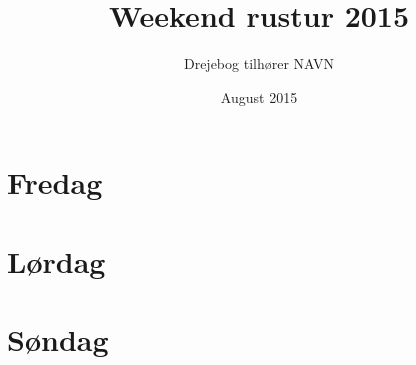\documentclass[11pt,a4paper,oneside,hidelinks]{article}
\title{Weekend rustur 2015}
\author{Drejebog tilhører NAVN}
\date{August 2015}
\newcommand{\lheadmsg}{Weekend 2015}
\begin{document}

\begin{titlepage}

\thispagestyle{empty} %
\end{titlepage}
\tableofcontents






\clearpage



\section*{Fredag}
\renewcommand{\lheadmsg}{Fredag}

\newpage




\clearpage

\section*{Lørdag}
\renewcommand{\lheadmsg}{Lørdag}




\clearpage

\section*{Søndag}
\renewcommand{\lheadmsg}{Søndag}







\renewcommand{\lheadmsg}{Party}


\clearpage

\clearpage

%
%
\end{document}
